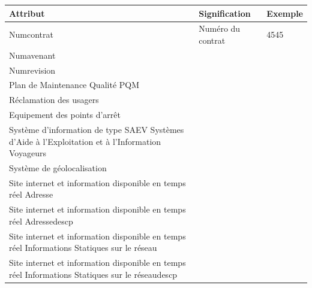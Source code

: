 \documentclass[a4paper]{report}
\begin{document}
\begin{doublespace}
	\begin{table}[H]
		\begin{center}
			\begin{tabularx}{17.5cm}{|X|p{3cm}|p{1.5cm}|}
				\hline
				\textbf{Attribut}                                                     & \textbf{Signification} & \textbf{Exemple} \\
				\hline
				Numcontrat                                                            & Numéro du contrat      & 4545             \\
				\hline
				Numavenant                                                            &                        &                  \\
				\hline
				Numrevision                                                           &                        &                  \\
				\hline
				Plan de Maintenance Qualité  PQM                                      &                        &                  \\
				\hline
				Réclamation des usagers                                               &                        &                  \\
				\hline
				Equipement des points d'arrêt                                         &                        &                  \\
				\hline
				Système d'information de type SAEV  Systèmes d'Aide à l'Exploitation et
				à l'Information Voyageurs                                             &                        &                  \\
				\hline
				Système de géolocalisation                                            &                        &                  \\
				\hline
				Site internet et information disponible en temps réel Adresse         &                        &                  \\
				\hline
				Site internet et information disponible en temps réel Adressedescp    &                        &                  \\
				\hline
				Site internet et information disponible en temps réel Informations
				Statiques sur le réseau                                               &                        &                  \\
				\hline
				Site internet et information disponible en temps réel Informations
				Statiques sur le réseaudescp                                          &                        &                  \\

\end{tabularx}
\end{center}
\end{table}
\end{doublespace}
\end{document}
